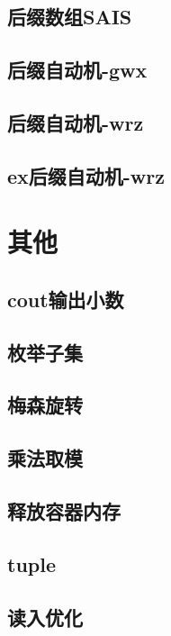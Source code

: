 \documentclass[titlepage,a4paper,10pt]{article}
\begin{document}
\begin{spacing}{0.8}
			\subsection{后缀数组SAIS}
				
			\subsection{后缀自动机-gwx}
				
			\subsection{后缀自动机-wrz}
				
			\subsection{ex后缀自动机-wrz}
				
		\section{其他}
			\subsection{cout输出小数}
				
			\subsection{枚举子集}
				
			\subsection{梅森旋转}
				
			\subsection{乘法取模}
				
			\subsection{释放容器内存}
				
			\subsection{tuple}
				
			\subsection{读入优化}
				

\end{spacing}
\end{document}
